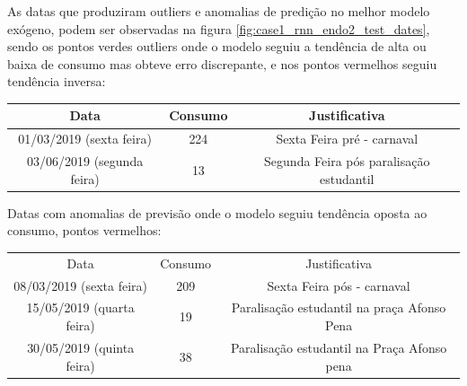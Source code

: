 \documentclass[	12pt, Times, openright, twoside, a4paper, english, brazil]{abntex2}
\begin{document}
            \begin{figure}[H]
            \end{figure}
            
            As datas que produziram outliers e anomalias de predição no melhor modelo exógeno, podem ser observadas na figura \ref{fig:case1_rnn_endo2_test_dates}, sendo os pontos verdes outliers onde o modelo seguiu a tendência de alta ou baixa de consumo mas obteve erro discrepante, e nos pontos vermelhos seguiu tendência inversa:


                 \begin{tabular}{|c|c|c|}
                 \rowcolor{gray!50}
                 \hline 
             Data & Consumo & Justificativa\\ \hline    
            01/03/2019 (sexta feira)    & 224 & Sexta Feira pré - carnaval\\
             03/06/2019 (segunda feira)  &  13 & Segunda Feira pós paralisação estudantil\\ \hline \end{tabular}

            Datas com anomalias de previsão onde o modelo seguiu tendência oposta ao consumo, pontos vermelhos:
            
                 \begin{tabular}{|c|c|c|}
                 \rowcolor{gray!50}
                 \hline
            Data & Consumo & Justificativa \\
            08/03/2019 (sexta feira)   & 209 &Sexta Feira pós - carnaval\\
           15/05/2019 (quarta feira)   & 19  & Paralisação estudantil na praça Afonso Pena\\
            30/05/2019 (quinta feira)   &  38  & Paralisação estudantil na Praça Afonso pena\\
            \hline \end{tabular}
\end{document}
